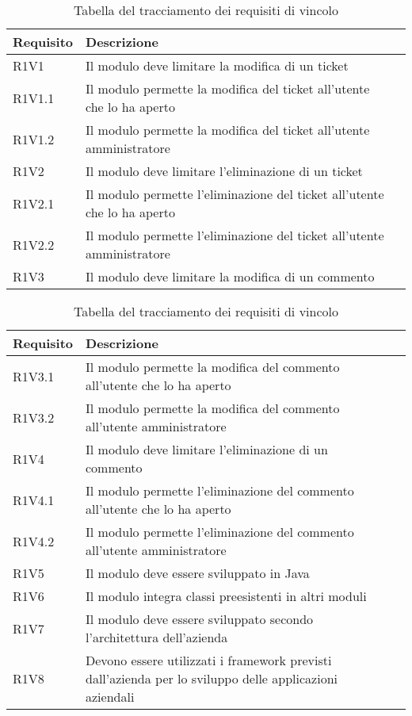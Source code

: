 \begin{table}[!h]
{\renewcommand{\arraystretch}{2}
\caption{Tabella del tracciamento dei requisiti di vincolo}
\label{tab:requisiti-vincolo}
\begin{tabularx}{\textwidth}{PXl}
\hline\hline
\textbf{Requisito} & \textbf{Descrizione} \\
\hline
R1V1 & Il modulo deve limitare la modifica di un ticket\\
\hline
R1V1.1 & Il modulo permette la modifica del ticket all'utente che lo ha aperto\\
\hline
R1V1.2 & Il modulo permette la modifica del ticket all'utente amministratore\\
\hline
R1V2 & Il modulo deve limitare l'eliminazione di un ticket\\
\hline
R1V2.1 & Il modulo permette l'eliminazione del ticket all'utente che lo ha aperto\\
\hline
R1V2.2 & Il modulo permette l'eliminazione del ticket all'utente amministratore\\
\hline

R1V3 & Il modulo deve limitare la modifica di un commento\\
\hline

\end{tabularx}
}
\end{table}


\begin{table}[H]
{\renewcommand{\arraystretch}{2}
\caption{Tabella del tracciamento dei requisiti di vincolo}
\label{tab:requisiti-vincolo}
\begin{tabularx}{\textwidth}{PXl}
\hline\hline
\textbf{Requisito} & \textbf{Descrizione} \\
\hline
R1V3.1 & Il modulo permette la modifica del commento all'utente che lo ha aperto\\
\hline
R1V3.2 & Il modulo permette la modifica del commento all'utente amministratore\\
\hline
R1V4 & Il modulo deve limitare l'eliminazione di un commento\\
\hline
R1V4.1 & Il modulo permette l'eliminazione del commento all'utente che lo ha aperto\\
\hline
R1V4.2 & Il modulo permette l'eliminazione del commento all'utente amministratore\\
\hline
R1V5 & Il modulo deve essere sviluppato in Java\\
\hline
R1V6 & Il modulo integra classi preesistenti in altri moduli\\
\hline
R1V7 & Il modulo deve essere sviluppato secondo l'architettura dell'azienda\\
\hline
R1V8 & Devono essere utilizzati i framework previsti dall'azienda per lo sviluppo delle applicazioni aziendali\\
\hline

\end{tabularx}
}
\end{table}


